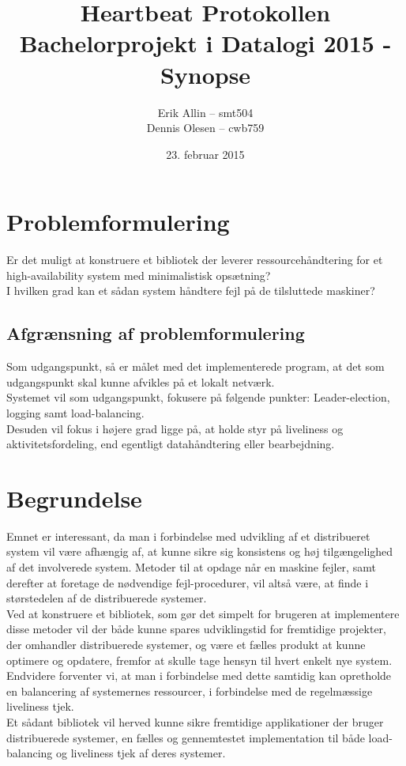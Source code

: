 \documentclass[a4paper,12pt]{article}
\title{\textbf{Heartbeat Protokollen} \\ Bachelorprojekt i Datalogi 2015 - Synopse}
\author{Erik Allin -- smt504 \\ Dennis Olesen -- cwb759}
\date{23. februar 2015}
\begin{document}
\maketitle
\newpage

\section*{Problemformulering}
Er det muligt at konstruere et bibliotek der leverer ressourcehåndtering for et high-availability system med minimalistisk opsætning? 
\\
I hvilken grad kan et sådan system håndtere fejl på de tilsluttede maskiner?

\subsection*{Afgrænsning af problemformulering}
Som udgangspunkt, så er målet med det implementerede program, at det som udgangspunkt skal kunne afvikles på et lokalt netværk.
\\[5px]
Systemet vil som udgangspunkt, fokusere på følgende punkter:
Leader-election, logging samt load-balancing.
\\[5px]
Desuden vil fokus i højere grad ligge på, at holde styr på liveliness og aktivitetsfordeling, end egentligt datahåndtering eller bearbejdning.


\section*{Begrundelse}
Emnet er interessant, da man i forbindelse med udvikling af et distribueret system vil være afhængig af, at kunne sikre sig konsistens og høj tilgængelighed af det involverede system. Metoder til at opdage når en maskine fejler, samt derefter at foretage de nødvendige fejl-procedurer, vil altså være, at finde i størstedelen af de distribuerede systemer.
\\
Ved at konstruere et bibliotek, som gør det simpelt for brugeren at implementere disse metoder vil der både kunne spares udviklingstid for fremtidige projekter, der omhandler distribuerede systemer, og være et fælles produkt at kunne optimere og opdatere, fremfor at skulle tage hensyn til hvert enkelt nye system. Endvidere forventer vi, at man i forbindelse med dette samtidig kan opretholde en balancering af systemernes ressourcer, i forbindelse med de regelmæssige liveliness tjek.
\\[5px]
Et sådant bibliotek vil herved kunne sikre fremtidige applikationer der bruger distribuerede systemer, en fælles og gennemtestet implementation til både load-balancing og liveliness tjek af deres systemer.
\end{document}
